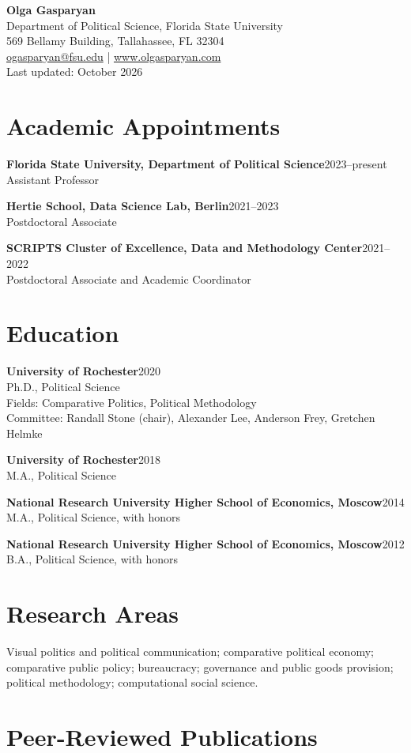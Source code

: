 \documentclass[10pt]{article}
\newcommand{\entry}[2]{\textbf{#1}\hfill #2\\}
\begin{document}
{\LARGE \textbf{Olga Gasparyan}}\\[3pt]
Department of Political Science, Florida State University\\
569 Bellamy Building, Tallahassee, FL 32304\\
\href{mailto:ogasparyan@fsu.edu}{ogasparyan@fsu.edu} \; | \; \href{http://www.olgasparyan.com}{www.olgasparyan.com}\\[-2pt]
\vspace{2pt}
{\small Last updated: October 2026}

\section{Academic Appointments}
\entry{Florida State University, Department of Political Science}{2023--present}
Assistant Professor

\entry{Hertie School, Data Science Lab, Berlin}{2021--2023}
Postdoctoral Associate

\entry{SCRIPTS Cluster of Excellence, Data and Methodology Center}{2021--2022}
Postdoctoral Associate and Academic Coordinator

\section{Education}
\entry{University of Rochester}{2020}
Ph.D., Political Science\\
Fields: Comparative Politics, Political Methodology\\
Committee: Randall Stone (chair), Alexander Lee, Anderson Frey, Gretchen Helmke

\entry{University of Rochester}{2018}
M.A., Political Science

\entry{National Research University Higher School of Economics, Moscow}{2014}
M.A., Political Science, with honors

\entry{National Research University Higher School of Economics, Moscow}{2012}
B.A., Political Science, with honors

\section{Research Areas}
Visual politics and political communication; comparative political economy; comparative public policy; bureaucracy; governance and public goods provision; political methodology; computational social science.

\section{Peer-Reviewed Publications}
\end{document}
